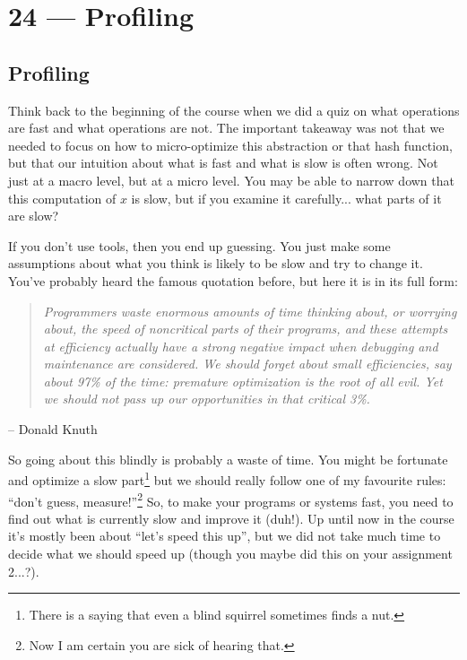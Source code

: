 \documentclass[a4paper]{report}
\begin{document}
\chapter*{24 --- Profiling}


\section*{Profiling}

Think back to the beginning of the course when we did a quiz on what operations are fast and what operations are not. The important takeaway was not that we needed to focus on how to micro-optimize this abstraction or that hash function, but that our intuition about what is fast and what is slow is often wrong. Not just at a macro level, but at a micro level. You may be able to narrow down that this computation of $x$ is slow, but if you examine it carefully... what parts of it are slow?

If you don't use tools, then you end up guessing. You just make some assumptions about what you think is likely to be slow and try to change it. You've probably heard the famous quotation before, but here it is in its full form:

\begin{quote}
\textit{Programmers waste enormous amounts of time thinking about, or worrying about, the speed of noncritical parts of their programs, and these attempts at efficiency actually have a strong negative impact when debugging and maintenance are considered. We should forget about small efficiencies, say about 97\% of the time: premature optimization is the root of all evil. Yet we should not pass up our opportunities in that critical 3\%.}
\end{quote}
	\hfill -- Donald Knuth

So going about this blindly is probably a waste of time. You might be fortunate and optimize a slow part\footnote{There is a saying that even a blind squirrel sometimes finds a nut.} but we should really follow one of my favourite rules: ``don't guess, measure!''\footnote{Now I am certain you are sick of hearing that.} So, to make your programs or systems fast, you need to find out what is currently slow and improve it (duh!). Up until now in the course it's mostly been about ``let's speed this up'', but we did not take much time to decide what we should speed up (though you maybe did this on your assignment 2...?).
\end{document}
